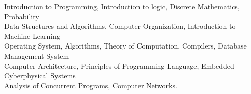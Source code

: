 {\fontsize{12pt}{1em}\bodyfontlight\upshape\color{text}
    \linebreak
    \linebreak
    Introduction to Programming,  Introduction to logic, Discrete Mathematics, Probability \\
    Data Structures and Algorithms,  Computer Organization, Introduction to Machine Learning \\
    Operating System, Algorithms, Theory of Computation, Compilers, Database Management System \\
    Computer Architecture, Principles of Programming Language, Embedded Cyberphysical Systems \\
    Analysis of Concurrent Programs, Computer Networks.

}
{\fontsize{9pt}{1em}\footerfont\upshape\color{text}
  \begin{tabular*}{\textwidth}{ l l }
  \end{tabular*}
}
\vspace{-0.5cm}

